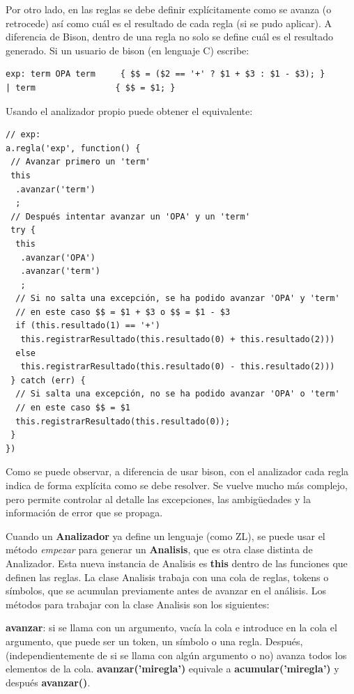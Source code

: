 \documentclass{report}
\begin{document}
	\vspace{10px}
	
	Por otro lado, en las reglas se debe definir explícitamente como se avanza (o retrocede) así como cuál es el resultado de cada regla (si se pudo aplicar). A diferencia de Bison, dentro de una regla no solo se define cuál es el resultado generado. Si un usuario de bison (en lenguaje C) escribe:
	
	\begin{BVerbatim}
exp: term OPA term     { $$ = ($2 == '+' ? $1 + $3 : $1 - $3); }
| term                { $$ = $1; }
	\end{BVerbatim}
	
	Usando el analizador propio puede obtener el equivalente:
	
	\begin{BVerbatim}
// exp:
a.regla('exp', function() {
 // Avanzar primero un 'term'
 this
  .avanzar('term')
  ;
 // Después intentar avanzar un 'OPA' y un 'term'
 try {
  this
   .avanzar('OPA')
   .avanzar('term')
   ;
  // Si no salta una excepción, se ha podido avanzar 'OPA' y 'term'
  // en este caso $$ = $1 + $3 o $$ = $1 - $3 
  if (this.resultado(1) == '+')
   this.registrarResultado(this.resultado(0) + this.resultado(2)))
  else
   this.registrarResultado(this.resultado(0) - this.resultado(2)))
 } catch (err) {
  // Si salta una excepción, no se ha podido avanzar 'OPA' o 'term'
  // en este caso $$ = $1
  this.registrarResultado(this.resultado(0));
 }
})
	\end{BVerbatim}
	
	Como se puede observar, a diferencia de usar bison, con el analizador cada regla indica de forma explícita como se debe resolver. Se vuelve mucho más complejo, pero permite controlar al detalle las excepciones, las ambigüedades y la información de error que se propaga. 
	
	\vspace{10px}
	
	Cuando un \textbf{Analizador} ya define un lenguaje (como ZL), se puede usar el método \textit{empezar} para generar un \textbf{Analisis}, que es otra clase distinta de Analizador. Esta nueva instancia de Analisis es \textbf{this} dentro de las funciones que definen las reglas. La clase Analisis trabaja con una cola de reglas, tokens o símbolos, que se acumulan previamente antes de avanzar en el análisis. Los métodos para trabajar con la clase Analisis son los siguientes:
	
	\vspace{10px}
	\noindent
	\textbf{avanzar}: si se llama con un argumento, vacía la cola e introduce en la cola el argumento, que puede ser un token, un símbolo o una regla. Después, (independientemente de si se llama con algún argumento o no) avanza todos los elementos de la cola. \textbf{avanzar('miregla')} equivale a \textbf{acumular('miregla')} y después \textbf{avanzar()}.
	
\end{document}
